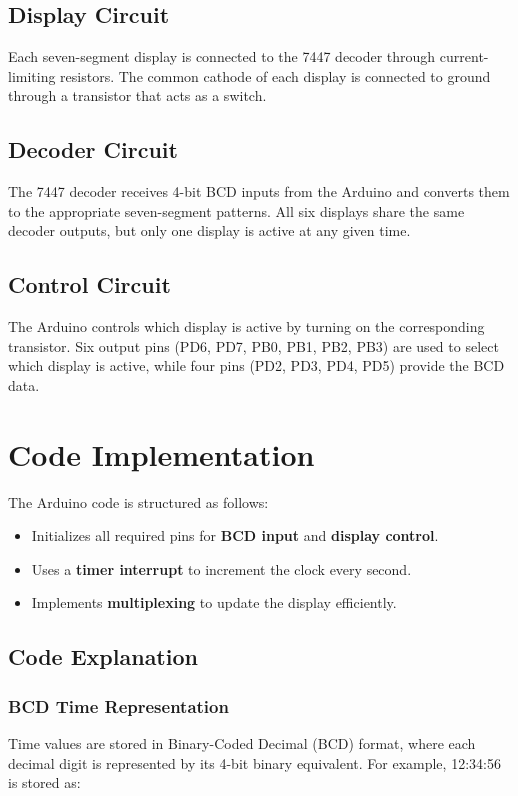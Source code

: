 \documentclass[a4paper,12pt]{article}
\begin{document}
\subsection{Display Circuit}
Each seven-segment display is connected to the 7447 decoder through current-limiting resistors. The common cathode of each display is connected to ground through a transistor that acts as a switch.

\subsection{Decoder Circuit}
The 7447 decoder receives 4-bit BCD inputs from the Arduino and converts them to the appropriate seven-segment patterns. All six displays share the same decoder outputs, but only one display is active at any given time.

\subsection{Control Circuit}
The Arduino controls which display is active by turning on the corresponding transistor. Six output pins (PD6, PD7, PB0, PB1, PB2, PB3) are used to select which display is active, while four pins (PD2, PD3, PD4, PD5) provide the BCD data.

\section{Code Implementation}
The Arduino code is structured as follows:
\begin{itemize}
    \item Initializes all required pins for \textbf{BCD input} and \textbf{display control}.
    \item Uses a \textbf{timer interrupt} to increment the clock every second.
    \item Implements \textbf{multiplexing} to update the display efficiently.
\end{itemize}


\subsection{Code Explanation}
\subsubsection{BCD Time Representation}
Time values are stored in Binary-Coded Decimal (BCD) format, where each decimal digit is represented by its 4-bit binary equivalent. For example, 12:34:56 is stored as:
\end{document}
